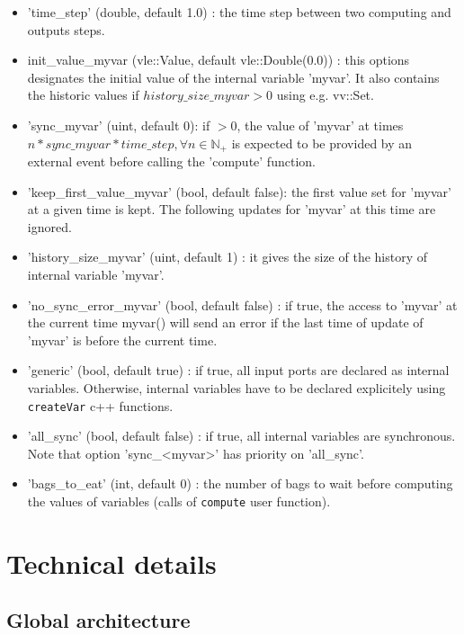 \documentclass{article}
\theoremstyle{remark}
\begin{document}
\begin{itemize}
  \item 'time\_step' (double, default 1.0) : the time step between two
  computing and outputs steps.
  \item init\_value\_myvar (vle::Value, default vle::Double(0.0)) :
  this options designates the initial value of the internal variable 'myvar'.
  It also contains the historic values if $history\_size\_myvar > 0$ using e.g.
  vv::Set.
  \item 'sync\_myvar' (uint, default 0): if $> 0$, the value of 'myvar' 
  at times $n * sync\_myvar * time\_step, \forall n \in \mathbb{N}_+$ is
  expected to be provided by an external event before calling the 'compute'
  function.
  \item 'keep\_first\_value\_myvar' (bool, default false): the first
  value set for 'myvar' at a given time is kept. The following updates for
  'myvar' at this time are ignored.
  \item 'history\_size\_myvar' (uint, default 1) : it gives the size of the
  history of internal variable 'myvar'. 
  \item 'no\_sync\_error\_myvar' (bool, default false) : if true, the access to
  'myvar' at the current time  myvar() will send an error if the last
  time of update of 'myvar' is before the current time.
  \item 'generic' (bool, default true) : if true, all input ports are
  declared as internal variables. Otherwise, internal variables have to be
  declared explicitely using {\tt createVar} c++ functions.
  \item 'all\_sync' (bool, default false) : if true, all internal variables 
  are synchronous. Note that option 'sync\_<myvar>' has priority on 'all\_sync'.
  \item 'bags\_to\_eat' (int, default 0) : the number of bags to wait before
  computing the values of variables (calls of {\tt compute} user function).
\end{itemize} 

\section{Technical details}

\subsection{Global architecture}
\label{sec:archi}
\end{document}
